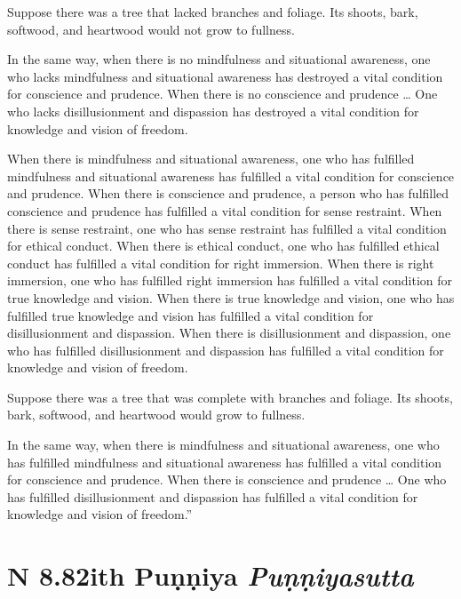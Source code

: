 \documentclass[12pt,openany]{book}%
\newcommand*{\suttatitleacronym}[1]{\smaller[2]{#1}\vspace*{.3em}}
\newcommand*{\suttatitletranslation}[1]{\linebreak{#1}}
\newcommand*{\suttatitleroot}[1]{\linebreak\smaller[2]\itshape{#1}}
\newcommand*{\tocacronym}[1]{\hspace*{-3.3em}{#1}\quad}
\newcommand*{\toctranslation}[1]{#1}
\newcommand*{\tocroot}[1]{(\textit{#1})}
\begin{document}
Suppose there was a tree that lacked branches and foliage. Its shoots, bark, softwood, and heartwood would not grow to fullness. 

In the same way, when there is no mindfulness and situational awareness, one who lacks mindfulness and situational awareness has destroyed a vital condition for conscience and prudence. When there is no conscience and prudence … One who lacks disillusionment and dispassion has destroyed a vital condition for knowledge and vision of freedom. 

When there is mindfulness and situational awareness, one who has fulfilled mindfulness and situational awareness has fulfilled a vital condition for conscience and prudence. When there is conscience and prudence, a person who has fulfilled conscience and prudence has fulfilled a vital condition for sense restraint. When there is sense restraint, one who has sense restraint has fulfilled a vital condition for ethical conduct. When there is ethical conduct, one who has fulfilled ethical conduct has fulfilled a vital condition for right immersion. When there is right immersion, one who has fulfilled right immersion has fulfilled a vital condition for true knowledge and vision. When there is true knowledge and vision, one who has fulfilled true knowledge and vision has fulfilled a vital condition for disillusionment and dispassion. When there is disillusionment and dispassion, one who has fulfilled disillusionment and dispassion has fulfilled a vital condition for knowledge and vision of freedom. 

Suppose there was a tree that was complete with branches and foliage. Its shoots, bark, softwood, and heartwood would grow to fullness. 

In the same way, when there is mindfulness and situational awareness, one who has fulfilled mindfulness and situational awareness has fulfilled a vital condition for conscience and prudence. When there is conscience and prudence … One who has fulfilled disillusionment and dispassion has fulfilled a vital condition for knowledge and vision of freedom.” 

%
\section*{{\suttatitleacronym AN 8.82}{\suttatitletranslation With Puṇṇiya }{\suttatitleroot Puṇṇiyasutta}}
\addcontentsline{toc}{section}{\tocacronym{AN 8.82} \toctranslation{With Puṇṇiya } \tocroot{Puṇṇiyasutta}}
\end{document}
